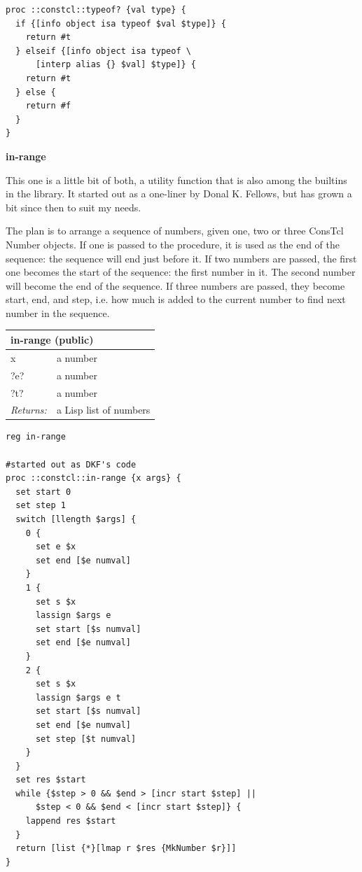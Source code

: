 \documentclass[twoside,9pt]{report}
\begin{document}
\noindent\makebox[\linewidth]{\rule{\linewidth}{0.4pt}}
\begin{lstlisting}
proc ::constcl::typeof? {val type} {
  if {[info object isa typeof $val $type]} {
    return #t
  } elseif {[info object isa typeof \
      [interp alias {} $val] $type]} {
    return #t
  } else {
    return #f
  }
}
\end{lstlisting}
\noindent\makebox[\linewidth]{\rule{\linewidth}{0.4pt}}

\textbf{in-range}


This one is a little bit of both, a utility function that is also among the builtins in the library. It started out as a one-liner by Donal K. Fellows, but has grown a bit since then to suit my needs.


The plan is to arrange a sequence of numbers, given one, two or three ConsTcl Number objects. If one is passed to the procedure, it is used as the end of the sequence: the sequence will end just before it. If two numbers are passed, the first one becomes the start of the sequence: the first number in it. The second number will become the end of the sequence. If three numbers are passed, they become start, end, and step, i.e. how much is added to the current number to find next number in the sequence.

\begin{tabular}{ |l l| }
\hline
\multicolumn{2}{|l|}{in-range (public)} \\
\hline
x & a number \\
?e? & a number \\
?t? & a number \\
\textit{Returns:} & a Lisp list of numbers \\
\hline
\end{tabular}

\noindent\makebox[\linewidth]{\rule{\linewidth}{0.4pt}}
\begin{lstlisting}
reg in-range
 
#started out as DKF's code
proc ::constcl::in-range {x args} {
  set start 0
  set step 1
  switch [llength $args] {
    0 {
      set e $x
      set end [$e numval]
    }
    1 {
      set s $x
      lassign $args e
      set start [$s numval]
      set end [$e numval]
    }
    2 {
      set s $x
      lassign $args e t
      set start [$s numval]
      set end [$e numval]
      set step [$t numval]
    }
  }
  set res $start
  while {$step > 0 && $end > [incr start $step] ||
      $step < 0 && $end < [incr start $step]} {
    lappend res $start
  }
  return [list {*}[lmap r $res {MkNumber $r}]]
}
\end{lstlisting}
\noindent\makebox[\linewidth]{\rule{\linewidth}{0.4pt}}
\end{document}
